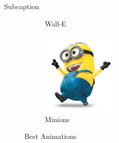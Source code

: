 \documentclass[10pt,times]{beamer}
\begin{document}
\begin{frame}[fragile]{Subcaption}
\begin{exampletwouptiny}
\begin{figure}
\begin{subfigure}[b]{0.3\textwidth}
    \caption{Wall-E}
    \label{fig:WallE}
  \end{subfigure}             
  \begin{subfigure}[b]{0.3\textwidth}
    \includegraphics[width=\textwidth]{figs/minion}
    \caption{Minions}
    \label{fig:Minnion}
  \end{subfigure}
  \caption{Best Animations}
  \label{fig:animations}
\end{figure}
\end{exampletwouptiny}
\end{frame}
\end{document}
